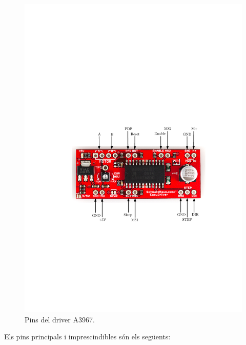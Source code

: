 \begin{figure}[H]
	\centering
	\includegraphics{driverpins}
	\caption{Pins del driver A3967.}
	\label{fig:PinsA3967}
\end{figure}


Els pins principals i imprescindibles són els següents:


